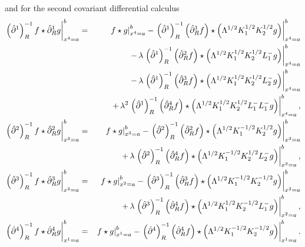 \documentclass[a4paper,11pt,oneside]{article}
\begin{document}
and for the second covariant differential calculus 
\begin{eqnarray}
\left. \left( \hat{\partial}^{1}\right) _{R}^{-1}f\star \hat{\partial}%
_{R}^{1}g\right| _{x^{4}=a}^{b} &=&\left. f\star g\right|
_{x^{4}=a}^{b}-\left. \left( \hat{\partial}^{1}\right) _{R}^{-1}\left( \hat{%
\partial}_{R}^{1}f\right) \star \left( \Lambda
^{1/2}K_{1}^{1/2}K_{2}^{1/2}g\right) \right| _{x^{4}=a}^{b} \\
&&-\,\lambda \left. \left( \hat{\partial}^{1}\right) _{R}^{-1}\left( \hat{%
\partial}_{R}^{2}f\right) \star \left( \Lambda
^{1/2}K_{1}^{1/2}K_{2}^{1/2}L_{1}^{-}g\right) \right| _{x^{4}=a}^{b} 
\nonumber \\
&&-\,\lambda \left. \left( \hat{\partial}^{1}\right) _{R}^{-1}\left( \hat{%
\partial}_{R}^{3}f\right) \star \left( \Lambda
^{1/2}K_{1}^{1/2}K_{2}^{1/2}L_{2}^{-}g\right) \right| _{x^{4}=a}^{b} 
\nonumber \\
&&+\,\lambda ^{2}\left. \left( \hat{\partial}^{1}\right) _{R}^{-1}\left( 
\hat{\partial}_{R}^{4}f\right) \star \left( \Lambda
^{1/2}K_{1}^{1/2}K_{2}^{1/2}L_{1}^{-}L_{1}^{-}g\right) \right|
_{x^{4}=a}^{b},  \nonumber \\
\left. \left( \hat{\partial}^{2}\right) _{R}^{-1}f\star \hat{\partial}%
_{R}^{2}g\right| _{x^{3}=a}^{b} &=&\left. f\star g\right|
_{x^{3}=a}^{b}-\left. \left( \hat{\partial}^{2}\right) _{R}^{-1}\left( \hat{%
\partial}_{R}^{2}f\right) \star \left( \Lambda
^{1/2}K_{1}^{-1/2}K_{2}^{1/2}g\right) \right| _{x^{3}=a}^{b}  \nonumber \\
&&+\,\lambda \left. \left( \hat{\partial}^{2}\right) _{R}^{-1}\left( \hat{%
\partial}_{R}^{4}f\right) \star \left( \Lambda
^{1/2}K_{1}^{-1/2}K_{2}^{1/2}L_{2}^{-}g\right) \right| _{x^{3}=a}^{b}, 
\nonumber \\
\left. \left( \hat{\partial}^{3}\right) _{R}^{-1}f\star \hat{\partial}%
_{R}^{3}g\right| _{x^{2}=a}^{b} &=&\left. f\star g\right|
_{x^{2}=a}^{b}-\left. \left( \hat{\partial}^{3}\right) _{R}^{-1}\left( \hat{%
\partial}_{R}^{3}f\right) \star \left( \Lambda
^{1/2}K_{1}^{-1/2}K_{2}^{-1/2}g\right) \right| _{x^{2}=a}^{b}  \nonumber \\
&&+\,\lambda \left. \left( \hat{\partial}^{3}\right) _{R}^{-1}\left( \hat{%
\partial}_{R}^{4}f\right) \star \left( \Lambda
^{1/2}K_{1}^{1/2}K_{2}^{-1/2}L_{1}^{-}g\right) \right| _{x^{2}=a}^{b}, 
\nonumber \\
\left. \left( \hat{\partial}^{4}\right) _{R}^{-1}f\star \hat{\partial}%
_{R}^{4}g\right| _{x^{1}=a}^{b} &=&\left. f\star g\right|
_{x^{1}=a}^{b}-\left. \left( \hat{\partial}^{4}\right) _{R}^{-1}\left( \hat{%
\partial}_{R}^{4}f\right) \star \left( \Lambda
^{1/2}K_{1}^{-1/2}K_{2}^{-1/2}g\right) \right| _{x^{1}=a}^{b}.  \nonumber
\end{eqnarray}
\end{document}
